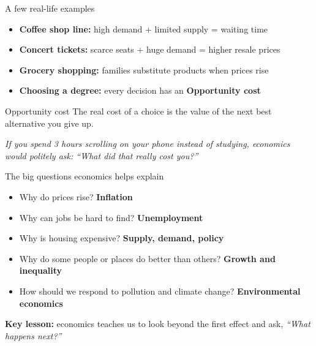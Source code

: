 \documentclass[aspectratio=169,11pt]{beamer}
\begin{document}
\begin{frame}{A few real-life examples}
\begin{itemize}
    \item \textbf{Coffee shop line:} high demand + limited supply = waiting time
    \item \textbf{Concert tickets:} scarce seats + huge demand = higher resale prices
    \item \textbf{Grocery shopping:} families substitute products when prices rise
    \item \textbf{Choosing a degree:} every decision has an \textbf{Opportunity cost}
\end{itemize}
\vspace{0.4cm}
\begin{block}{Opportunity cost}
The real cost of a choice is the value of the next best alternative you give up.
\end{block}
\vspace{0.2cm}
\textit{If you spend 3 hours scrolling on your phone instead of studying, economics would politely ask: ``What did that really cost you?''}
\end{frame}

\begin{frame}{The big questions economics helps explain}
\begin{itemize}
    \item Why do prices rise? \hfill \textbf{Inflation}
    \item Why can jobs be hard to find? \hfill \textbf{Unemployment}
    \item Why is housing expensive? \hfill \textbf{Supply, demand, policy}
    \item Why do some people or places do better than others? \hfill \textbf{Growth and inequality}
    \item How should we respond to pollution and climate change? \hfill \textbf{Environmental economics}
\end{itemize}
\vspace{0.5cm}
\textbf{Key lesson:} economics teaches us to look beyond the first effect and ask,\newline
\textit{``What happens next?''}
\end{frame}
\end{document}
